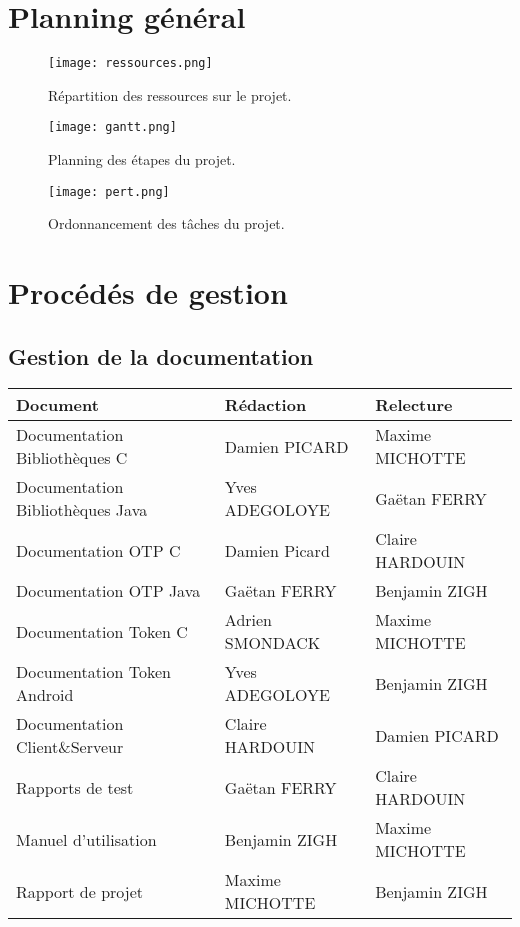\documentclass{../../res/univ-projet}
\begin{document}
\newpage
\section{Planning général}

\begin{figure}[h]
\texttt{[image: ressources.png]}
\caption{Répartition des ressources sur le projet.}
\end{figure}
\begin{figure}[h]
\texttt{[image: gantt.png]}
\caption{Planning des étapes du projet.}
\end{figure}

\begin{figure}[h]
\texttt{[image: pert.png]}
\caption{Ordonnancement des tâches du projet.}
\end{figure}

\newpage


\section{Procédés de gestion}
\subsection{Gestion de la documentation}
\begin{tabular}{|l|l|l|}
 \hline
 Document & Rédaction & Relecture \\
 \hline
 Documentation Bibliothèques C & Damien PICARD & Maxime MICHOTTE\\
 Documentation Bibliothèques Java & Yves ADEGOLOYE & Gaëtan FERRY\\
 Documentation OTP C & Damien Picard & Claire HARDOUIN\\
 Documentation OTP Java & Gaëtan FERRY & Benjamin ZIGH \\
 Documentation Token C & Adrien SMONDACK & Maxime MICHOTTE\\
 Documentation Token Android & Yves ADEGOLOYE & Benjamin ZIGH\\
 Documentation Client\&Serveur & Claire HARDOUIN & Damien PICARD \\
 Rapports de test & Gaëtan FERRY & Claire HARDOUIN \\
 Manuel d'utilisation & Benjamin ZIGH & Maxime MICHOTTE \\
 Rapport de projet & Maxime MICHOTTE & Benjamin ZIGH \\
 \hline
 
\end{tabular}
\end{document}
